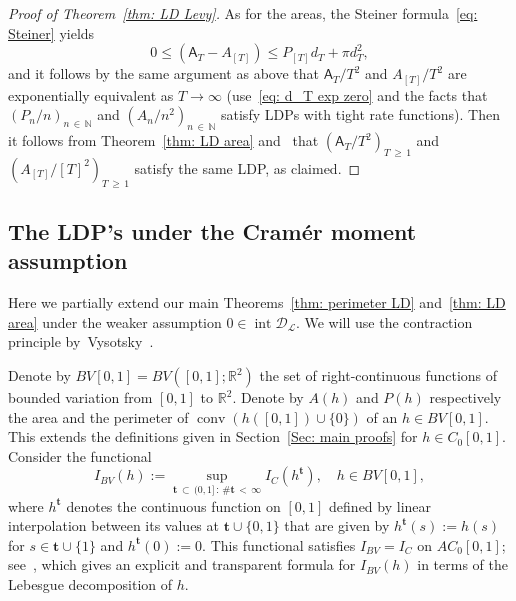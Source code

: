 \documentclass[AHL,Unicode,published]{cedram}
\DeclareMathOperator{\conv}{conv}
\DeclareMathOperator{\intr}{int}
\newcommand{\Rbb}{\mathbb{R}}
\newcommand{\N}{\mathbb{N}}
\newcommand{\Dcl}{\mathcal{D}}
\newcommand{\Lcl}{\mathcal{L}}
\newcommand{\bft}{\mathbf{t}}
\newcommand{\sfA}{\mathsf{A}}
\begin{document}
\begin{proof}[Proof of Theorem~\ref{thm: LD Levy}]
As for the areas, the Steiner formula~\eqref{eq: Steiner} yields
\[
0 \le \left(\sfA_T - A_{[T]}\right) \le P_{[T] } d_T + \pi d_T^2,
\]
and it follows by the same argument as above that $\sfA_T/T^2 $ and $ A_{[T]}/T^2 $ are exponentially equivalent as $T \to \infty$ (use~\eqref{eq: d_T exp zero} and the facts that $ (P_n/n)_{n\,\in\,\N} $ and $ (A_n/n^2)_{n\,\in\,\N} $ satisfy LDPs with tight rate functions). Then it follows from Theorem~\ref{thm: LD area} and~\cite[Theorem~4.2.13]{DemboZeitouni} that $(\sfA_T/T^2)_{T\,\ge\,1} $ and $ (A_{[T]}/[T]^2)_{T\,\ge\,1} $ satisfy the same LDP, as claimed.
\end{proof}

\subsection{The LDP's under the Cram\'er moment assumption} \label{sec: LDP Cramer}
Here we partially extend our main Theorems~\ref{thm: perimeter LD} and~\ref{thm: LD area} under the weaker assumption $0 \in \intr \Dcl_{\Lcl}$. We will use the contraction principle by~Vysotsky~\cite{VysotskyNote}.


Denote by $BV[0,1]=BV([0,1];\Rbb^2)$ the set of right-continuous functions of bounded variation from $[0,1]$ to $\Rbb^2$. Denote by $A(h)$ and $P(h)$ respectively the area and the perimeter of $\conv(h([0,1]) \cup \{ 0 \}) $ of an $h \in BV[0,1]$. This extends the definitions given in Section~\ref{Sec: main proofs} for $h \in C_0[0,1]$. Consider the functional
\begin{equation}\label{eq: I BV}
I_{BV}(h):= \sup_{\bft\,\subset\,(0,1]\,: \, \# \bft\,<\,\infty } I_C(h^{\bft}), \quad h \in BV[0,1],
\end{equation}
where $h^{\bft}$ denotes the continuous function on $[0,1]$ defined by linear interpolation between its values at $\bft \cup \{0,1\}$ that are given by $h^{\bft}(s) := h(s)$ for $s \in \bft \cup \{1\}$ and $h^{\bft}(0):=0$. This functional satisfies $I_{BV}=I_C$ on $AC_0[0,1]$; see~\cite[Theorem~5.1]{VysotskyNote}, which gives an explicit 
and transparent formula for $I_{BV}(h)$ in terms of the Lebesgue decomposition of $h$.
\end{document}
